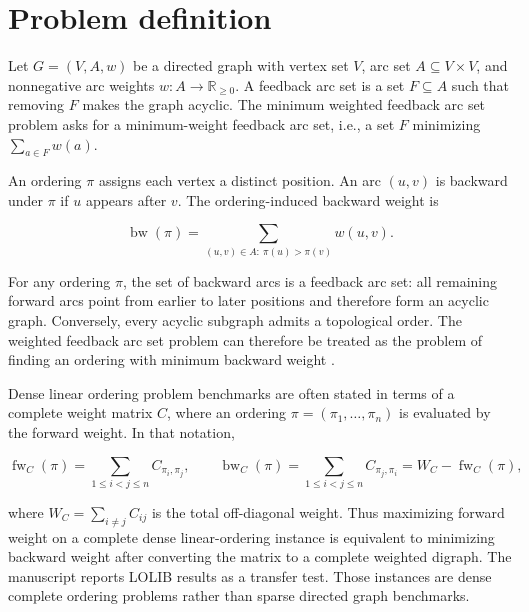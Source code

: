 \section{Problem definition}
\label{sec:problem-definition}

Let \(G=(V,A,w)\) be a directed graph with vertex set \(V\), arc set \(A\subseteq V\times V\), and nonnegative arc weights \(w:A\to \mathbb{R}_{\ge 0}\). A feedback arc set is a set \(F\subseteq A\) such that removing \(F\) makes the graph acyclic. The minimum weighted feedback arc set problem asks for a minimum-weight feedback arc set, i.e., a set \(F\) minimizing \(\sum_{a\in F}w(a)\).

An ordering \(\pi\) assigns each vertex a distinct position. An arc \((u,v)\) is backward under \(\pi\) if \(u\) appears after \(v\). The ordering-induced backward weight is

\begin{equation}
    \operatorname{bw}(\pi)
    =
    \sum_{(u,v)\in A:\ \pi(u)>\pi(v)} w(u,v).
    \label{eq:backward-weight}
\end{equation}

For any ordering \(\pi\), the set of backward arcs is a feedback arc set: all remaining forward arcs point from earlier to later positions and therefore form an acyclic graph. Conversely, every acyclic subgraph admits a topological order. The weighted feedback arc set problem can therefore be treated as the problem of finding an ordering with minimum backward weight \cite{F90,K72}.

Dense linear ordering problem benchmarks are often stated in terms of a complete weight matrix \(C\), where an ordering \(\pi=(\pi_1,\ldots,\pi_n)\) is evaluated by the forward weight. In that notation,

\begin{equation}
    \operatorname{fw}_{C}(\pi)
    =
    \sum_{1\le i<j\le n} C_{\pi_i,\pi_j},
    \qquad
    \operatorname{bw}_{C}(\pi)
    =
    \sum_{1\le i<j\le n} C_{\pi_j,\pi_i}
    =
    W_C-\operatorname{fw}_{C}(\pi),
    \label{eq:lolib-forward-backward}
\end{equation}

where \(W_C=\sum_{i\ne j}C_{ij}\) is the total off-diagonal weight. Thus maximizing forward weight on a complete dense linear-ordering instance is equivalent to minimizing backward weight after converting the matrix to a complete weighted digraph. The manuscript reports LOLIB results as a transfer test. Those instances are dense complete ordering problems rather than sparse directed graph benchmarks.
